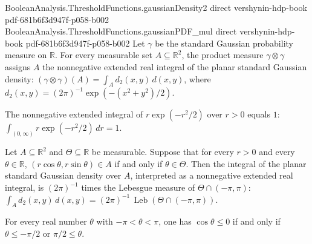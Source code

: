 \begin{lemma}
\leanok
{}
\proofstep
  {BooleanAnalysis.ThresholdFunctions.gaussianDensity2}
  {direct}
  {vershynin-hdp-book}
  {pdf-681b6f3d947f-p058-b002}
\proofstep
  {BooleanAnalysis.ThresholdFunctions.gaussianPDF_mul}
  {direct}
  {vershynin-hdp-book}
  {pdf-681b6f3d947f-p058-b002}
Let $\gamma$ be the standard Gaussian probability measure on $\mathbb R$. For every
measurable set $A\subseteq\mathbb R^2$, the product measure $\gamma\otimes\gamma$
assigns $A$ the nonnegative extended real integral of the planar standard Gaussian
density: $(\gamma\otimes\gamma)(A)=\int_A d_2(x,y)\,d(x,y)$, where
$d_2(x,y)=(2\pi)^{-1}\exp(-(x^2+y^2)/2)$.
\end{lemma}

\begin{lemma}
\leanok
{}
The nonnegative extended integral of $r\exp(-r^2/2)$ over $r>0$ equals $1$:
$\displaystyle\int_{(0,\infty)} r\exp(-r^2/2)\,dr=1$.
\end{lemma}

\begin{lemma}
\leanok
{}
Let $A\subseteq\mathbb R^2$ and $\Theta\subseteq\mathbb R$ be measurable. Suppose that
for every $r>0$ and every $\theta\in\mathbb R$, $(r\cos\theta,r\sin\theta)\in A$ if and
only if $\theta\in\Theta$. Then the integral of the planar standard Gaussian density
over $A$, interpreted as a nonnegative extended real integral, is $(2\pi)^{-1}$ times
the Lebesgue measure of $\Theta\cap(-\pi,\pi)$: $\int_A
d_2(x,y)\,d(x,y)=(2\pi)^{-1}\,\operatorname{Leb}(\Theta\cap(-\pi,\pi))$.
\end{lemma}

\begin{lemma}
\leanok
{}
For every real number $\theta$ with $-\pi<\theta<\pi$, one has $\cos\theta\le0$ if and
only if $\theta\le-\pi/2$ or $\pi/2\le\theta$.
\end{lemma}

